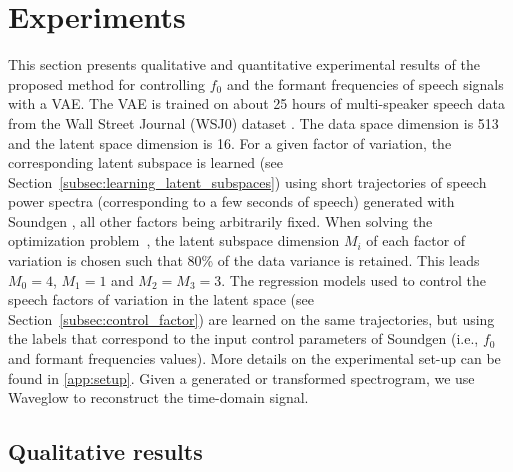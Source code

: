 \documentclass[review]{elsarticle}
\begin{document}

\section{Experiments}
\label{sec:results}
This section presents qualitative and quantitative experimental results of the proposed method for controlling $f_0$ and the formant frequencies of speech signals with a VAE. The VAE is trained on about 25 hours of multi-speaker speech data from the Wall Street Journal (WSJ0) dataset \citep{WSJ0}. The data space dimension is 513 and the latent space dimension is 16. For a given factor of variation, the corresponding latent subspace is learned (see Section~\ref{subsec:learning_latent_subspaces}) using short trajectories of speech power spectra  (corresponding to a few seconds of speech) generated with Soundgen \citep{Anikin2019}, all other factors being arbitrarily fixed. When solving the optimization problem~, the latent subspace dimension $M_i$ of each factor of variation is chosen such that 80\% of the data variance is retained. This leads $M_0=4$, $M_1=1$ and $M_2 = M_3 = 3$. The regression models used to control the speech factors of variation in the latent space (see Section~\ref{subsec:control_factor}) are learned on the same trajectories, but using the labels that correspond to the input control parameters of Soundgen (i.e., $f_0$ and formant frequencies values). More details on the experimental set-up can be found in \ref{app:setup}. Given a generated or transformed spectrogram, we use Waveglow \citep{prenger2019waveglow} to reconstruct the time-domain signal. 

\subsection{Qualitative results}
\end{document}
